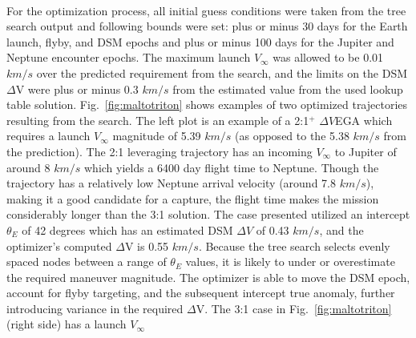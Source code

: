 \documentclass[letterpaper, paper,11pt]{./AAS}		%
\begin{document}
\\\indent For the optimization process, all initial guess conditions were taken from the tree search output and following bounds were set: plus or minus 30 days for the Earth launch, flyby, and DSM epochs and plus or minus 100 days for the Jupiter and Neptune encounter epochs. The maximum launch $V_\infty$ was allowed to be 0.01 $km/s$ over the predicted requirement from the search, and the limits on the DSM $\Delta$V were plus or minus 0.3 $km/s$ from the estimated value from the used lookup table solution. Fig.~\ref{fig:maltotriton} shows examples of two optimized trajectories resulting from the search. The left plot is an example of a 2:1$^{+}$ $\Delta V$EGA which requires a launch $V_\infty$ magnitude of 5.39 $km/s$ (as opposed to the 5.38 $km/s$ from the prediction). The 2:1 leveraging trajectory has an incoming $V_\infty$ to Jupiter of around 8 $km/s$ which yields a 6400 day flight time to Neptune. Though the trajectory has a relatively low Neptune arrival velocity (around 7.8 $km/s$), making it a good candidate for a capture, the flight time makes the mission considerably longer than the 3:1 solution. The case presented utilized an intercept $\theta_E$ of 42 degrees which has an estimated DSM $\Delta V$ of 0.43 $km/s$, and the optimizer's computed $\Delta$V is 0.55 $km/s$. Because the tree search selects evenly spaced nodes between a range of $\theta_E$ values, it is likely to under or overestimate the required maneuver magnitude. The optimizer is able to move the DSM epoch, account for flyby targeting, and the subsequent intercept true anomaly, further introducing variance in the required $\Delta$V. The 3:1 case in Fig.~\ref{fig:maltotriton} (right side) has a launch $V_\infty$
\end{document}
